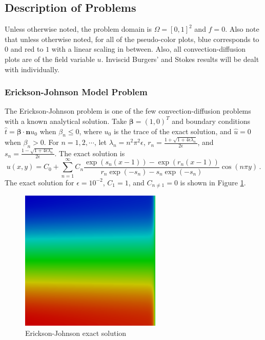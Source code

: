 \documentclass[letterpaper]{article}
\def\bbeta{\boldsymbol\beta}
\begin{document}
\subsection{Description of Problems}\label{sec:problemDescriptions}
Unless otherwise noted, the problem domain is $\Omega=[0,1]^2$ and $f=0$. Also
note that unless otherwise noted, for all of the
pseudo-color plots, blue corresponds to $0$ and red to $1$ with a linear
scaling in between. Also, all convection-diffusion plots are of the field variable $u$.
Inviscid Burgers' and Stokes results will be dealt with individually.

\subsubsection{Erickson-Johnson Model Problem}
The Erickson-Johnson problem is one of the few convection-diffusion problems
with a known analytical solution. Take
$\bbeta=(1,0)^T$ and boundary conditions $\hat t=\bbeta\cdot\mathbf{n} u_0$ when
$\beta_n\le0$, where $u_0$ is the trace of the exact solution, and $\hat u=0$
when $\beta_n>0$. For
$n=1,2,\cdots$, let
$\lambda_n=n^2\pi^2\epsilon$,
$r_n=\frac{1+\sqrt{1+4\epsilon\lambda_n}}{2\epsilon}$, and
$s_n=\frac{1-\sqrt{1+4\epsilon\lambda_n}}{2\epsilon}$. The exact solution
is
\begin{equation}
u(x,y)=C_0+\sum_{n=1}^\infty C_n\frac{\exp(s_n(x-1))-\exp(r_n(x-1))}
{r_n\exp(-s_n)-s_n\exp(-s_n)}\cos(n\pi y)\,.
\label{eq:ericksonExact}
\end{equation}
The exact solution for $\epsilon=10^{-2}$, $C_1=1$, and $C_{n\neq1}=0$ is
shown in Figure \ref{fig:erickson}.

\begin{figure}[p]
\centering
\includegraphics[width=0.6\textwidth]{figs/Erickson/exact.png}
\caption{Erickson-Johnson exact solution}
\label{fig:erickson}
\end{figure}
\end{document}
